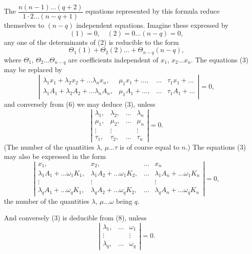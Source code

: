 \documentclass[11pt,a4paper]{article}
\theoremstyle{plain}
\theoremstyle{definition}
\theoremstyle{remark}
\begin{document}
The $\dfrac{n(n-1) \ldots (q+2)}{1 \cdot 2 \ldots (n-q+1)}$ equations represented by this formula reduce themselves to
$(n-q)$ independent equations. Imagine these expressed by
\[
(1) = 0, \quad (2) = 0 \ldots (n-q) = 0 \tag{4},
\]
any one of the determinants of (2) is reducible to the form
\[
\Theta_1(1) + \Theta_2(2) \ldots + \Theta_{n-q}(n-q) \tag{5},
\]
where $\Theta_1$, $\Theta_2 \ldots \Theta_{n-q}$ are coefficients independent of $x_1$, $x_2 \ldots x_n$.
The equations (3) may be replaced by
\[
\left|
\begin{array}{cccc}
\lambda_1 x_1 + \lambda_2 x_2 + \ldots \lambda_n x_n, & \mu_1 x_1 + \ldots, & \ldots & \tau_1 x_1 + \ldots \\
\lambda_1 A_1 + \lambda_2 A_2 + \ldots \lambda_n A_n, & \mu_1 A_1 + \ldots, & \ldots & \tau_1 A_1 + \ldots
\end{array}
\right| = 0
\tag{6},
\]
and conversely from (6) we may deduce (3), unless
\[
\left|
\begin{array}{cccc}
\lambda_1, & \lambda_2, & \ldots & \lambda_n \\
\mu_1, & \mu_2, & \ldots & \mu_n \\
\vdots & \vdots & & \vdots \\
\tau_1, & \tau_2, & \ldots & \tau_n
\end{array}
\right| = 0
\tag{7}.
\]
(The number of the quantities $\lambda$, $\mu \ldots \tau$ is of course equal to $n$.)
The equations (3) may also be expressed in the form
\[
\left|
\begin{array}{cccc}
x_1, & x_2, & \ldots & x_n \\
\lambda_1 A_1 + \ldots \omega_1 K_1, & \lambda_1 A_2 + \ldots \omega_1 K_2, & \ldots & \lambda_1 A_n + \ldots \omega_1 K_n \\
\vdots & \vdots & & \vdots \\
\lambda_q A_1 + \ldots \omega_q K_1, & \lambda_q A_2 + \ldots \omega_q K_2, & \ldots & \lambda_q A_n + \ldots \omega_q K_n
\end{array}
\right| = 0
\tag{8},
\]
the number of the quantities $\lambda$, $\mu \ldots \omega$ being $q$.

And conversely (3) is deducible from (8), unless
\[
\left|
\begin{array}{cccc}
\lambda_1, & \ldots & \omega_1 \\
\vdots & & \vdots \\
\lambda_q, & \ldots & \omega_q
\end{array}
\right| = 0
\tag{9}.
\]
\end{document}
